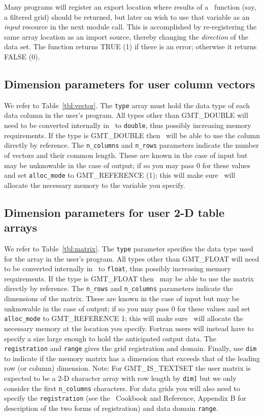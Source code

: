 \documentclass[11pt]{report}
\begin{document}
Many programs will register an export location where results of a \GMT\ function (say,
a filtered grid) should be returned, but later on wish to use that variable as an \emph{input}
resource in the next module call.  This is accomplished by re-registering the same array
location as an import source, thereby changing the \emph{direction} of the data set.
The function returns TRUE (1) if there is an error; otherwise it returns FALSE (0).

\subsection{Dimension parameters for user column vectors}
We refer to Table~\ref{tbl:vector}.  The \texttt{type} array must hold the
data type of each data column in the user's program.  All types other than GMT\_DOUBLE will need
to be converted internally in \GMT\ to \texttt{double}, thus possibly increasing memory requirements.
If the type is GMT\_DOUBLE then \GMT\ will be able to use the column directly by reference.  The \texttt{n\_columns}
and \texttt{n\_rows} parameters indicate the number of vectors and their common length.  These are known in
the case of input but may be unknowable in the case of output; if so you may pass 0 for these values
and set \texttt{alloc\_mode} to GMT\_REFERENCE (1); this will make
sure \GMT\ will allocate the necessary memory to the variable you specify.

\subsection{Dimension parameters for user 2-D table arrays}

We refer to Table~\ref{tbl:matrix}.  The \texttt{type} parameter specifies the
data type used for the array in the user's program.  All types other than GMT\_FLOAT will need
to be converted internally in \GMT\ to \texttt{float}, thus possibly increasing memory requirements.
If the type is GMT\_FLOAT then \GMT\ may be able to use the matrix directly by reference.  The \texttt{n\_rows}
and \texttt{n\_columns} parameters indicate the dimensions of the matrix.  These are known in
the case of input but may be unknowable in the case
of output; if so you may pass 0 for these values and set \texttt{alloc\_mode} to GMT\_REFERENCE 1; this will make
sure \GMT\ will allocate the necessary memory at the location you specify.  Fortran users
will instead have to specify a size large enough to hold the anticipated output data.
The \texttt{registration} and \texttt{range} gives the grid registration and domain.
Finally, use \texttt{dim} to indicate if the memory matrix has a dimension that
exceeds that of the leading row (or column) dimension. Note: For GMT\_IS\_TEXTSET
the user matrix is expected to be a 2-D character array with row length by \texttt{dim]}
but we only consider the first \texttt{n\_columns} characters.  For data grids you will
also need to specify the \texttt{registration}  (see the \GMT\ Cookbook and Reference,
Appendix B for description of the two forms of registration) and data domain \texttt{range}.
\end{document}
